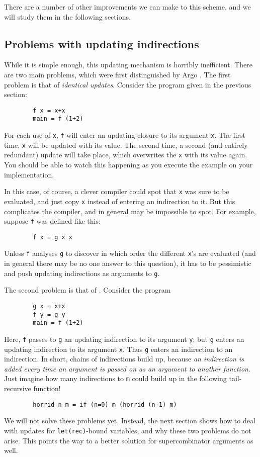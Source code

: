 There are a number of other improvements we can make to this scheme,
and we will study them in the following sections.

\subsection{Problems with updating indirections}

While it is simple enough, this updating mechanism is horribly inefficient.
There are two main problems, which were first distinguished by
Argo \cite{Argo89}.
The first problem is that of {\em identical updates}.  
Consider the program
given in the previous section:
\begin{verbatim}
        f x = x+x
        main = f (1+2)
\end{verbatim}
For each use of \mbox{\tt x}, \mbox{\tt f} will enter an updating closure to its argument \mbox{\tt x}.
The first time, \mbox{\tt x} will be updated with its value.  The second time,
a second (and entirely redundant) update will take place, which overwrites
the \mbox{\tt x} with its value again.  You should be able to watch this happening
as you execute the example on your implementation.

In this case, of course, a clever compiler
could spot that \mbox{\tt x} was sure to be evaluated, and just copy \mbox{\tt x} instead
of entering an indirection to it.  But this complicates the compiler, and
in general may be impossible to spot.  For example, suppose \mbox{\tt f} was defined
like this:
\begin{verbatim}
        f x = g x x
\end{verbatim}
Unless \mbox{\tt f} analyses \mbox{\tt g} to discover in which order the different \mbox{\tt x}'s are
evaluated (and in general there may be no one answer to this question), it
has to be pessimistic and push updating indirections as arguments to \mbox{\tt g}.

The second problem is that of .  Consider the
program
\begin{verbatim}
        g x = x+x
        f y = g y
        main = f (1+2)
\end{verbatim}
Here, \mbox{\tt f} passes to \mbox{\tt g} an updating indirection to its argument \mbox{\tt y}; but
\mbox{\tt g} enters an updating indirection to its argument \mbox{\tt x}.  Thus \mbox{\tt g} enters
an indirection to an indirection. In short, chains of indirections
build up, because {\em an indirection is added
every time an argument is passed on as an argument to another function}.
Just imagine how many indirections to \mbox{\tt m}
could build up in the following tail-recursive function!
\begin{verbatim}
        horrid n m = if (n=0) m (horrid (n-1) m)
\end{verbatim}
We will not solve these problems yet.  Instead, the next section shows
how to deal with updates for \mbox{\tt let(rec)}-bound variables, and why these
two problems do not arise.  This points the way to a better solution for
supercombinator arguments as well.

